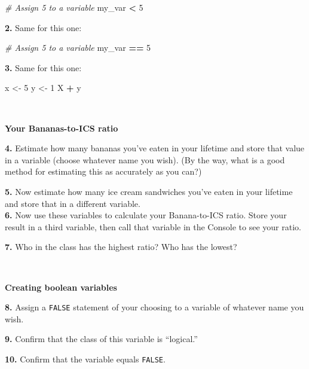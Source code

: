 \documentclass[
]{book}
\newenvironment{Shaded}{\begin{snugshade}}{\end{snugshade}}
\newcommand{\CommentTok}[1]{\textcolor[rgb]{0.56,0.35,0.01}{\textit{#1}}}
\newcommand{\DecValTok}[1]{\textcolor[rgb]{0.00,0.00,0.81}{#1}}
\newcommand{\NormalTok}[1]{#1}
\newcommand{\OperatorTok}[1]{\textcolor[rgb]{0.81,0.36,0.00}{\textbf{#1}}}
\newcommand{\StringTok}[1]{\textcolor[rgb]{0.31,0.60,0.02}{#1}}
\begin{document}
\begin{Shaded}
\begin{Highlighting}[]
\CommentTok{# Assign 5 to a variable}
\NormalTok{my_var }\OperatorTok{<}\StringTok{ }\DecValTok{5}
\end{Highlighting}
\end{Shaded}

\textbf{2.} Same for this one:

\begin{Shaded}
\begin{Highlighting}[]
\CommentTok{# Assign 5 to a variable}
\NormalTok{my_var }\OperatorTok{==}\StringTok{ }\DecValTok{5}
\end{Highlighting}
\end{Shaded}

\textbf{3.} Same for this one:

\begin{Shaded}
\begin{Highlighting}[]
\NormalTok{x <-}\StringTok{ }\DecValTok{5}
\NormalTok{y <-}\StringTok{ }\DecValTok{1}
\NormalTok{X }\OperatorTok{+}\StringTok{ }\NormalTok{y}
\end{Highlighting}
\end{Shaded}

~

\textbf{Your Bananas-to-ICS ratio}

\textbf{4.} Estimate how many bananas you've eaten in your lifetime and store that value in a variable (choose whatever name you wish). (By the way, what is a good method for estimating this as accurately as you can?)

\textbf{5.} Now estimate how many ice cream sandwiches you've eaten in your lifetime and store that in a different variable.\\
\textbf{6.} Now use these variables to calculate your Banana-to-ICS ratio. Store your result in a third variable, then call that variable in the Console to see your ratio.

\textbf{7.} Who in the class has the highest ratio? Who has the lowest?

~

\textbf{Creating boolean variables}

\textbf{8.} Assign a \texttt{FALSE} statement of your choosing to a variable of whatever name you wish.

\textbf{9.} Confirm that the class of this variable is ``logical.''

\textbf{10.} Confirm that the variable equals \texttt{FALSE}.
\end{document}
